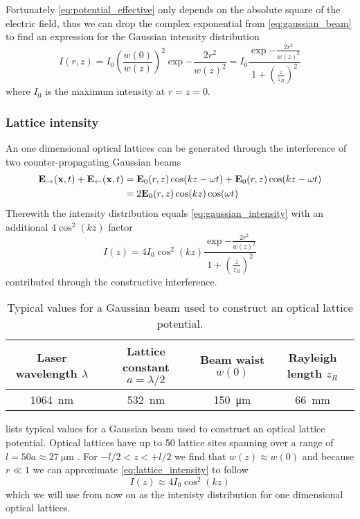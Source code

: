 Fortunately \cref{eq:potential_effective} only depends on the absolute
square of the electric field, thus we can drop the complex exponential from
\cref{eq:gaussian_beam} to find an expression for the Gaussian intensity
distribution
\begin{equation}
  I(r,z)
  =
  I_0
  \left(\frac{w(0)}{w(z)}\right)^2
  \exp{-\frac{2r^2}{w(z)^2}}
  =
  I_0
  \frac{\exp{-\frac{2r^2}{w(z)^2}}}{1+\left(\frac{z}{z_R}\right)^2}
  \label{eq:gaussian_intensity}
\end{equation}
where $I_0$ is the maximum intensity at $r=z=0$.

\subsubsection{Lattice intensity}

An one dimensional optical lattices can be generated through the interference
of two counter-propagating Gaussian beams
\begin{align*}
  \vb{E}_\rightarrow(\vb{x},t)+\vb{E}_\leftarrow(\vb{x},t)
  &=
  \vb{E}_0(r,z)\cos(kz-\omega t)+\vb{E}_0(r,z)\cos(kz-\omega t)\\
  &=
  2\vb{E}_0(r,z)\cos(kz)\cos(\omega t)
\end{align*}
Therewith the intensity distribution equals
\cref{eq:gaussian_intensity} with an additional $4\cos^2(kz)$ factor
\begin{equation}
  I(z)
  =
  4I_0\cos^2(kz)
  \frac{\exp{-\frac{2r^2}{w(z)^2}}}{1+\left(\frac{z}{z_R}\right)^2}
  \label{eq:lattice_intensity}
\end{equation}
contributed through the constructive interference.
\begin{table}[h]
  \centering
  \begin{tabular}{|c|c|c|c|}
    \hline
    Laser wavelength $\lambda$ &
    Lattice constant $a=\lambda/2$ &
    Beam waist $w(0)$ &
    Rayleigh length $z_R$ \\
    \hline
    \SI{1064}{\nano\meter} &
    \SI{532}{\nano\meter} &
    \SI{150}{\micro\meter} &
    \SI{66}{\milli\meter} \\
    \hline
  \end{tabular}
  \captionsetup{width=.8\textwidth}
  \caption{Typical values for a Gaussian beam used to construct an optical
    lattice potential.}
  \label{tab:gaussian_beam_lattice}
\end{table}
 lists typical values for a Gaussian beam
used to construct an optical lattice potential. Optical lattices have up to
50 lattice sites spanning over a range of $l=50a\approx\SI{27}{\micro\meter}$
\cite{Rom2009}. For $-l/2<z<+l/2$ we find that $w(z)\approx w(0)$ and because
$r\ll1$ we can approximate \cref{eq:lattice_intensity} to follow
\begin{equation}
  I(z)
  \approx
  4I_0\cos^2(kz)
  \label{eq:gaussian_intensity_approx}
\end{equation}
which we will use from now on as the intenisty distribution for one
dimensional optical lattices.

